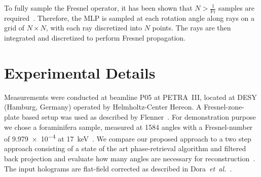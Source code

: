 \documentclass{article}
\begin{document}
To fully sample the Fresnel operator, it has been shown that $N > \frac{1}{\mathrm{Fr}}$ samples are required~\cite{paganinCoherentXrayOptics2006a}.  
Therefore, the MLP is sampled at each rotation angle along rays on a grid of $N \times N$, with each ray discretized into $N$ points.  
The rays are then integrated and discretized to perform Fresnel propagation.  
\section{Experimental Details}
Measurements were conducted at beamline P05 at PETRA~III, located at DESY (Hamburg, Germany) operated by Helmholtz-Center Hereon.
A Fresnel-zone-plate based setup was used as described by Flenner~\cite{flennerHardXrayNanoholotomography2020b}.
For demonstration purpose we chose a foraminifera sample, measured at 1584 angles with a Fresnel-number of \num{9.979e-4} at \qty{17}{\keV}~\cite{niEarlyDiagenesisForaminiferal2020}.
We compare our proposed approach to a two step approach consisting of a state of the art phase-retrieval algorithm and filtered back projection and evaluate how many angles are necessary for reconstruction~\cite{doraArtifactsuppressingReconstructionStrongly2024}.
The input holograms are flat-field corrected as described in Dora~\textit{et~al.}~\cite{doraArtifactsuppressingReconstructionStrongly2024}.



\vfill\pagebreak

\label{sec:refs}


\end{document}
